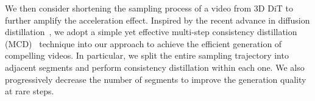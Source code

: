 

We then consider shortening the sampling process of a video from 3D DiT to further amplify the acceleration effect. 
Inspired by the recent advance in diffusion distillation~\citep{salimans2022progressive,song2023consistency,kim2023consistency,liu2023instaflow,sauer2023adversarial,yin2024one,heek2024multistep,xie2024mlcm}, we 
adopt
a simple yet effective multi-step consistency distillation (MCD)~\citep{heek2024multistep} technique into our approach to achieve the efficient generation of compelling videos. 
In particular, we split the entire sampling trajectory into adjacent segments and perform consistency distillation within each one. 
We also progressively decrease the number of segments to improve the generation quality at rare steps. 

